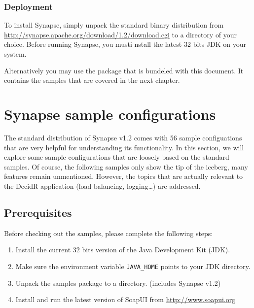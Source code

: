 \subsubsection{Deployment}
\label{subsec:deployment}

To install Synapse, simply unpack the standard binary distribution from
\url{http://synapse.apache.org/download/1.2/download.cgi} to a directory of
your choice. Before running Synapse, you musti nstall the latest 32 bits JDK on
your system.

Alternatively you may use the package that is bundeled with this document. It
contains the samples that are covered in the next chapter.

\section{Synapse sample configurations}
\label{chap:Synpase-sample-configurations}
\lstset{frame=single,
	    basicstyle=\tiny,
	    numbers=left,                   
		numberstyle=\tiny, 
	    commentstyle=\textit,
	    breaklines=true}

The standard distribution of Synapse v1.2 comes with 56 sample configuations that
are very helpful for understanding its functionality. In this section, we will
explore some sample configurations that are loosely based on the standard
samples. Of course, the following samples only show the tip of the iceberg, many
features remain unmentioned. However, the topics that are actually relevant to
the DecidR application (load balancing, logging\ldots) are addressed.

\subsection{Prerequisites}
\label{sec:prerequisites}

Before checking out the samples, please complete the following steps: 

\begin{enumerate}
\item Install the current 32 bits version of the Java Development Kit (JDK).
\item Make sure the environment variable \texttt{JAVA\_HOME} points to your JDK
directory.
\item Unpack the samples package to a directory. (includes Synapse
v1.2)
\item Install and run the latest version of SoapUI from
\url{http://www.soapui.org}
\end{enumerate}

